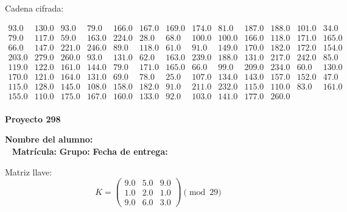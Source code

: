 \documentclass[12pt]{article}
\begin{document}
Cadena cifrada:
\begin{center}
$\begin{array}{lllllllllllll}
93.0 & 130.0 & 93.0 & 79.0 & 166.0 & 167.0 & 169.0 & 174.0 & 81.0 & 187.0 & 188.0 & 101.0 & 34.0\\
79.0 & 117.0 & 59.0 & 163.0 & 224.0 & 28.0 & 68.0 & 100.0 & 100.0 & 166.0 & 118.0 & 171.0 & 165.0\\
66.0 & 147.0 & 221.0 & 246.0 & 89.0 & 118.0 & 61.0 & 91.0 & 149.0 & 170.0 & 182.0 & 172.0 & 154.0\\
203.0 & 279.0 & 260.0 & 93.0 & 131.0 & 62.0 & 163.0 & 239.0 & 188.0 & 131.0 & 217.0 & 242.0 & 85.0\\
119.0 & 122.0 & 161.0 & 144.0 & 79.0 & 171.0 & 165.0 & 66.0 & 99.0 & 209.0 & 234.0 & 60.0 & 130.0\\
170.0 & 121.0 & 164.0 & 131.0 & 69.0 & 78.0 & 25.0 & 107.0 & 134.0 & 143.0 & 157.0 & 152.0 & 47.0\\
115.0 & 128.0 & 145.0 & 108.0 & 158.0 & 182.0 & 91.0 & 211.0 & 232.0 & 115.0 & 110.0 & 83.0 & 161.0\\
155.0 & 110.0 & 175.0 & 167.0 & 160.0 & 133.0 & 92.0 & 103.0 & 141.0 & 177.0 & 260.0\\
\end{array}$
\end{center}

\newpage


\textbf{Proyecto 298}

\textbf{Nombre del alumno:} \underline{\hspace{13cm}}\\\
\vspace{1cm}
\textbf{Matrícula:} \underline{\hspace{4cm}} \hspace{1cm}
\textbf{Grupo:} \underline{\hspace{2cm}}
\textbf{Fecha de entrega:} \underline{\hspace{2cm}}

\medskip

Matriz llave:
\[
K = \begin{pmatrix}
9.0 & 5.0 & 9.0\\
1.0 & 2.0 & 1.0\\
9.0 & 6.0 & 3.0
\end{pmatrix} \pmod{29}
\]
\end{document}
